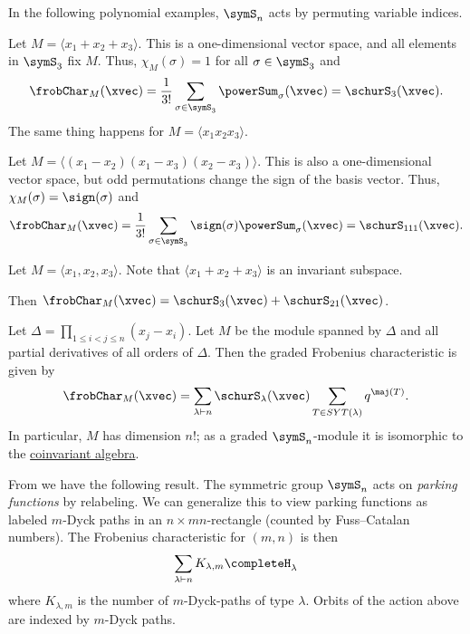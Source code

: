 In the following polynomial examples, $\symS_n$ acts by permuting variable indices.

\begin{example}
Let $M = \langle x_1 + x_2 + x_3 \rangle$. This is a one-dimensional vector space,
and all elements in $\symS_3$ fix $M$.
Thus, $\chi_M(\sigma)=1$ for all $\sigma \in \symS_3$ and
\[
\frobChar_M(\xvec)
=
\frac{1}{3!} \sum_{\sigma \in \symS_3} \powerSum_\sigma(\xvec)
= \schurS_{3}(\xvec).
\]
The same thing happens for $M = \langle x_1 x_2 x_3 \rangle$.
\end{example}

\begin{example}
Let $M = \langle (x_1-x_2)(x_1-x_3)(x_2-x_3) \rangle$.
This is also a one-dimensional vector space,
but odd permutations change the sign of the basis vector.
Thus, $\chi_M(\sigma)=\sign(\sigma)$ and
\[
\frobChar_M(\xvec)
=
\frac{1}{3!}
\sum_{\sigma \in \symS_3} \sign(\sigma) \powerSum_\sigma(\xvec)
= \schurS_{111}(\xvec).
\]
\end{example}

\begin{example}
Let $M = \langle x_1 , x_2 , x_3 \rangle$.
Note that $\langle x_1 + x_2 + x_3 \rangle$ is an invariant subspace.

Then $\frobChar_M(\xvec) = \schurS_{3}(\xvec) + \schurS_{21}(\xvec)$.
\end{example}


\begin{example}
Let $\Delta = \prod_{1\leq i < j \leq n} (x_j-x_i)$.
Let $M$ be the module spanned by $\Delta$ and all partial derivatives of all orders of $\Delta$.
Then the graded Frobenius characteristic is given by
\[
 \frobChar_M(\xvec) = \sum_{\lambda \vdash n} \schurS_\lambda(\xvec) \sum_{T \in SYT(\lambda)} q^{\maj(T)}.
\]
In particular, $M$ has dimension $n!$; as a graded $\symS_n$-module it is
isomorphic to the \hyperref[coinvariantAlgebra]{coinvariant algebra}.
\end{example}

\begin{example}
From \cite{ArmstrongLoehrWarrington2015} we have the following result.
The symmetric group $\symS_n$ acts on \emph{parking functions} by relabeling.
We can generalize this to view parking functions as labeled $m$-Dyck paths
in an $n \times mn$-rectangle (counted by Fuss--Catalan numbers).
The Frobenius characteristic for $(m,n)$ is then
\[
   \sum_{\lambda \vdash n} K_{\lambda,m} \completeH_\lambda
\]
where $K_{\lambda,m}$ is the number of $m$-Dyck-paths of type $\lambda$.
Orbits of the action above are indexed by $m$-Dyck paths.
\end{example}


